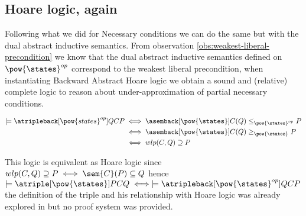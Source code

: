 \subsection{Hoare logic, again}

Following what we did for Necessary conditions we can do the same but with the
dual abstract inductive semantics. From observation 
\ref{obs:weakest-liberal-precondition} we know that the dual abstract inductive 
semantics defined on $\pow{\states}^{op}$ correspond to the weakest liberal 
precondition, when instantiating Backward Abstract Hoare logic we obtain a sound
and (relative) complete logic to reason about under-approximation of partial 
necessary conditions.

\begin{align*}
  \models \atripleback[\pow{states}^{op}]{Q}{C}{P}
    & \iff \asemback[\pow{\states}]{C}(Q) \leq_{\pow{\states}^{op}} P \\
    & \iff \asemback[\pow{\states}]{C}(Q) \geq_{\pow{\states}} P \\
    & \iff wlp(C, Q) \supseteq P \\
\end{align*}

This logic is equivalent as Hoare logic since $wlp(C, Q) \supseteq P \iff 
\sem{C}(P) \subseteq Q$ hence $\models \atriple[\pow{\states}]{P}{C}{Q} \iff 
\models \atripleback[\pow{\states}^{op}]{Q}{C}{P}$ the definition of the triple
and his relationship with Hoare logic was already explored in \cite{Zhang22}
but no proof system was provided.

